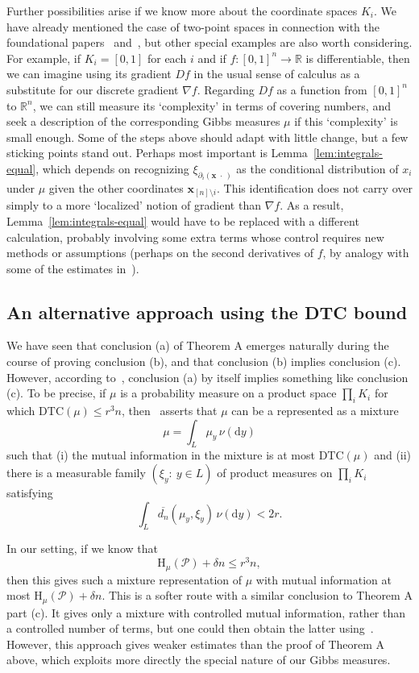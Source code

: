 \documentclass[aop,preprint]{imsart}
\theoremstyle{remark}
\renewcommand{\bf}[1]{\boldsymbol{#1}}
\newcommand{\bbR}{\mathbb{R}}
\newcommand{\rmH}{\mathrm{H}}
\renewcommand{\d}{\mathrm{d}}
\renewcommand{\P}{\mathcal{P}}
\newcommand{\ol}[1]{\overline{#1}}
\renewcommand{\to}{\longrightarrow}
\newcommand{\DTC}{\mathrm{DTC}}
\begin{document}
Further possibilities arise if we know more about the coordinate spaces $K_i$.  We have already mentioned the case of two-point spaces in connection with the foundational papers~\cite{ChaDem16} and~\cite{Eld--GWcomp}, but other special examples are also worth considering. For example, if $K_i = [0,1]$ for each $i$ and if $f:[0,1]^n\to\bbR$ is differentiable, then we can imagine using its gradient $Df$ in the usual sense of calculus as a substitute for our discrete gradient $\nabla f$. Regarding $Df$ as a function from $[0,1]^n$ to $\bbR^n$, we can still measure its `complexity' in terms of covering numbers, and seek a description of the corresponding Gibbs measures $\mu$ if this `complexity' is small enough. Some of the steps above should adapt with little change, but a few sticking points stand out.  Perhaps most important is Lemma~\ref{lem:integrals-equal}, which depends on recognizing $\xi_{\partial_i(\bf{x}\,\,\cdot\,)}$ as the conditional distribution of $x_i$ under $\mu$ given the other coordinates $\bf{x}_{[n]\setminus i}$.  This identification does not carry over simply to a more `localized' notion of gradient than $\nabla f$.  As a result, Lemma~\ref{lem:integrals-equal} would have to be replaced with a different calculation, probably involving some extra terms whose control requires new methods or assumptions (perhaps on the second derivatives of $f$, by analogy with some of the estimates in~\cite{ChaDem16}).


\subsection{An alternative approach using the DTC bound}

We have seen that conclusion (a) of Theorem A emerges naturally during the course of proving conclusion (b), and that conclusion (b) implies conclusion (c).  However, according to~\cite[Theorem A]{Aus--TC+DTC}, conclusion (a) by itself implies something like conclusion (c).  To be precise, if $\mu$ is a probability measure on a product space $\prod_i K_i$ for which $\DTC(\mu) \leq r^3 n$, then~\cite[Theorem A]{Aus--TC+DTC} asserts that $\mu$ can be a represented as a mixture
\[\mu = \int_L \mu_y\,\nu(\d y)\]
such that (i) the mutual information in the mixture is at most $\DTC(\mu)$ and (ii) there is a measurable family $(\xi_y:\ y\in L)$ of product measures on $\prod_i K_i$ satisfying
\[\int_L \ol{d_n}(\mu_y,\xi_y)\,\nu(\d y) < 2r.\]

In our setting, if we know that
\[\rmH_\mu(\P) + \delta n \leq r^3 n,\]
then this gives such a mixture representation of $\mu$ with mutual information at most $\rmH_\mu(\P) + \delta n$.  This is a softer route with a similar conclusion to Theorem A part (c).  It gives only a mixture with controlled mutual information, rather than a controlled number of terms, but one could then obtain the latter using~\cite[Theorem 9.5]{Aus--WP}.  However, this approach gives weaker estimates than the proof of Theorem A above, which exploits more directly the special nature of our Gibbs measures.
\end{document}

